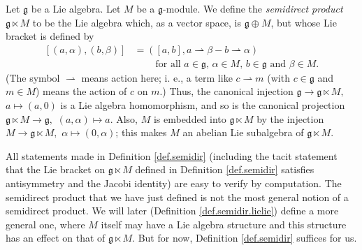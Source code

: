 \documentclass[etingof-lie.tex]{subfiles}
\begin{document}
\begin{definition}
\label{def.semidir}Let $\mathfrak{g}$ be a Lie algebra. Let $M$ be a
$\mathfrak{g}$-module. We define the \textit{semidirect product}
$\mathfrak{g}\ltimes M$ to be the Lie algebra which, as a vector space, is
$\mathfrak{g}\oplus M$, but whose Lie bracket is defined by%
\begin{align*}
\left[  \left(  a,\alpha\right)  ,\left(  b,\beta\right)  \right]   &
=\left(  \left[  a,b\right]  ,a\rightharpoonup\beta-b\rightharpoonup
\alpha\right) \\
&  \ \ \ \ \ \ \ \ \ \ \left.  \text{for all }a\in\mathfrak{g}\text{, }%
\alpha\in M\text{, }b\in\mathfrak{g}\text{ and }\beta\in M\right.  .
\end{align*}
(The symbol $\rightharpoonup$ means action here; i. e., a term like
$c\rightharpoonup m$ (with $c\in\mathfrak{g}$ and $m\in M$) means the action
of $c$ on $m$.) Thus, the canonical injection $\mathfrak{g}\rightarrow
\mathfrak{g}\ltimes M,$ $a\mapsto\left(  a,0\right)  $ is a Lie algebra
homomorphism, and so is the canonical projection $\mathfrak{g}\ltimes
M\rightarrow\mathfrak{g},$ $\left(  a,\alpha\right)  \mapsto a$. Also, $M$ is
embedded into $\mathfrak{g}\ltimes M$ by the injection $M\rightarrow
\mathfrak{g}\ltimes M,$ $\alpha\mapsto\left(  0,\alpha\right)  $; this makes
$M$ an abelian Lie subalgebra of $\mathfrak{g}\ltimes M$.
\end{definition}

All statements made in Definition \ref{def.semidir} (including the tacit
statement that the Lie bracket on $\mathfrak{g}\ltimes M$ defined in
Definition \ref{def.semidir} satisfies antisymmetry and the Jacobi identity)
are easy to verify by computation. The semidirect product that we have just
defined is not the most general notion of a semidirect product. We will later
(Definition \ref{def.semidir.lielie}) define a more general one, where $M$
itself may have a Lie algebra structure and this structure has an effect on
that of $\mathfrak{g}\ltimes M$. But for now, Definition \ref{def.semidir}
suffices for us.
\end{document}
